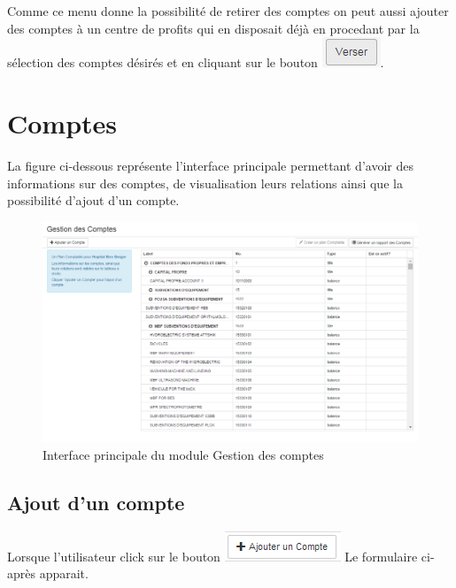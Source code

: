 \documentclass[12pt,a4paper]{report}
\begin{document}
Comme ce menu donne la possibilité de retirer des comptes on peut aussi ajouter des comptes à un centre de profits qui en disposait déjà en procedant par la sélection des comptes désirés et en cliquant sur le bouton \includegraphics[scale=0.7]{pic/VerserCompte.png}.



\newpage
\section{Comptes}
La figure ci-dessous représente l'interface principale permettant d'avoir des informations sur des comptes, de visualisation  leurs relations ainsi que la possibilité d'ajout d'un compte.

\begin{figure}[h]
\begin{center}
\includegraphics[width=13cm]{pic/GestionCompte.png}
\end{center}
\caption{Interface principale du module Gestion des comptes}
\label{Interface principale du module Gestion des comptes}
\end{figure}

\subsection{Ajout d'un compte}
Lorsque l'utilisateur click sur le bouton \includegraphics[scale=1]{pic/AjouterCompte.png} Le formulaire ci-après apparait.
\end{document}
